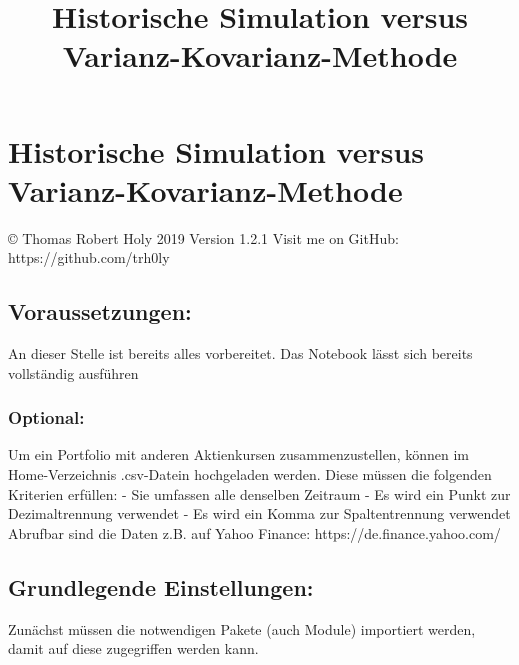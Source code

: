 \documentclass[paper=landscape]{scrartcl}
\title{Historische Simulation versus Varianz-Kovarianz-Methode}
\begin{document}
    
    
    \maketitle
    
    

    
    \hypertarget{historische-simulation-versus-varianz-kovarianz-methode}{%
\section{Historische Simulation versus
Varianz-Kovarianz-Methode}\label{historische-simulation-versus-varianz-kovarianz-methode}}

© Thomas Robert Holy 2019 Version 1.2.1 Visit me on GitHub:
https://github.com/trh0ly

\hypertarget{voraussetzungen}{%
\subsection{Voraussetzungen:}\label{voraussetzungen}}

An dieser Stelle ist bereits alles vorbereitet. Das Notebook lässt sich
bereits vollständig ausführen

\hypertarget{optional}{%
\subsubsection{Optional:}\label{optional}}

Um ein Portfolio mit anderen Aktienkursen zusammenzustellen, können im
Home-Verzeichnis .csv-Datein hochgeladen werden. Diese müssen die
folgenden Kriterien erfüllen: - Sie umfassen alle denselben Zeitraum -
Es wird ein Punkt zur Dezimaltrennung verwendet - Es wird ein Komma zur
Spaltentrennung verwendet Abrufbar sind die Daten z.B. auf Yahoo
Finance: https://de.finance.yahoo.com/

\hypertarget{grundlegende-einstellungen}{%
\subsection{Grundlegende
Einstellungen:}\label{grundlegende-einstellungen}}

Zunächst müssen die notwendigen Pakete (auch Module) importiert werden,
damit auf diese zugegriffen werden kann.
\end{document}
